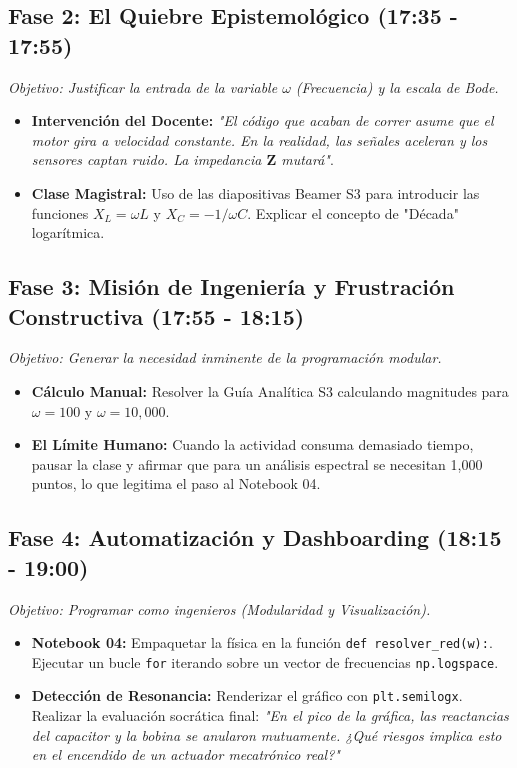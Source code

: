 \documentclass[11pt,a4paper]{article}
\begin{document}
\subsection*{Fase 2: El Quiebre Epistemológico (17:35 - 17:55)}
\textit{Objetivo: Justificar la entrada de la variable $\omega$ (Frecuencia) y la escala de Bode.}
\begin{itemize}
    \item \textbf{Intervención del Docente:} \textit{"El código que acaban de correr asume que el motor gira a velocidad constante. En la realidad, las señales aceleran y los sensores captan ruido. La impedancia $\mathbf{Z}$ mutará"}.
    \item \textbf{Clase Magistral:} Uso de las diapositivas Beamer S3 para introducir las funciones $X_L = \omega L$ y $X_C = -1/\omega C$. Explicar el concepto de "Década" logarítmica.
\end{itemize}

\subsection*{Fase 3: Misión de Ingeniería y Frustración Constructiva (17:55 - 18:15)}
\textit{Objetivo: Generar la necesidad inminente de la programación modular.}
\begin{itemize}
    \item \textbf{Cálculo Manual:} Resolver la Guía Analítica S3 calculando magnitudes para $\omega = 100$ y $\omega = 10,000$.
    \item \textbf{El Límite Humano:} Cuando la actividad consuma demasiado tiempo, pausar la clase y afirmar que para un análisis espectral se necesitan 1,000 puntos, lo que legitima el paso al Notebook 04.
\end{itemize}

\subsection*{Fase 4: Automatización y Dashboarding (18:15 - 19:00)}
\textit{Objetivo: Programar como ingenieros (Modularidad y Visualización).}
\begin{itemize}
    \item \textbf{Notebook 04:} Empaquetar la física en la función \texttt{def resolver\_red(w):}. Ejecutar un bucle \texttt{for} iterando sobre un vector de frecuencias \texttt{np.logspace}.
    \item \textbf{Detección de Resonancia:} Renderizar el gráfico con \texttt{plt.semilogx}. Realizar la evaluación socrática final: \textit{"En el pico de la gráfica, las reactancias del capacitor y la bobina se anularon mutuamente. ¿Qué riesgos implica esto en el encendido de un actuador mecatrónico real?"}
\end{itemize}
\end{document}
